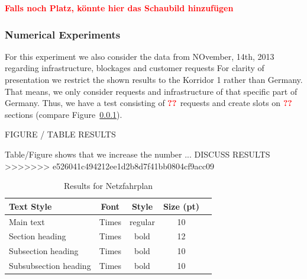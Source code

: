 \textbf{\textcolor{red}{Falls noch Platz, könnte hier das Schaubild hinzufügen}}

\subsubsection{Numerical Experiments}
For this experiment we also consider the data from NOvember, 14th, 2013 regarding infrastructure, blockages and customer requests For clarity of presentation we restrict the shown results to the Korridor 1 \cite{} rather than Germany. That means, we only consider requests and infrastructure of that specific part of Germany. Thus, we have a test consisting of $\textbf{\textcolor{red}{??}}$ requests and create slots on $\textbf{\textcolor{red}{??}}$ sections (compare Figure~\ref{}).

FIGURE / TABLE RESULTS

Table/Figure shows that we increase the number ... DISCUSS RESULTS
>>>>>>> e526041c494212ee1d2b8d7f41bb0804cf9acc09
%
\begin{table}[h]
	\centering
	\caption{Results for Netzfahrplan}
	\label{tab:result_Netzfpl}
	\begin{tabular}{lcccc} \hline
		\textbf{Text Style}   & \textbf{Font} & \textbf{Style} & \textbf{Size (pt)} \\ \hline
		Main text             & Times         & regular        & 10                 \\
		Section heading       & Times         & bold           & 12                 \\
		Subsection heading    & Times         & bold           & 10                 \\
		Subsubsection heading & Times         & bold           & 10                 \\ \hline
	\end{tabular}
\end{table}
\par



